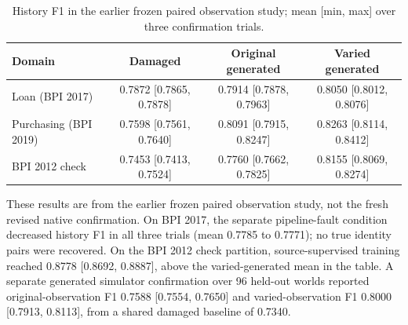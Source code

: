 \begin{table}[t]
\centering
\small
\caption{History F1 in the earlier frozen paired observation study; mean [min, max] over three confirmation trials.}
\label{tab:original-paired-observation-results}
\begin{tabular}{lccc}
\toprule
Domain & Damaged & Original generated & Varied generated \\
\midrule
Loan (BPI 2017) & 0.7872 [0.7865, 0.7878] & 0.7914 [0.7878, 0.7963] & 0.8050 [0.8012, 0.8076] \\
Purchasing (BPI 2019) & 0.7598 [0.7561, 0.7640] & 0.8091 [0.7915, 0.8247] & 0.8263 [0.8114, 0.8412] \\
BPI 2012 check & 0.7453 [0.7413, 0.7524] & 0.7760 [0.7662, 0.7825] & 0.8155 [0.8069, 0.8274] \\
\bottomrule
\end{tabular}
\end{table}

These results are from the earlier frozen paired observation study, not the fresh revised native confirmation. On BPI 2017, the separate pipeline-fault condition decreased history F1 in all three trials (mean 0.7785 to 0.7771); no true identity pairs were recovered. On the BPI 2012 check partition, source-supervised training reached 0.8778 [0.8692, 0.8887], above the varied-generated mean in the table. A separate generated simulator confirmation over 96 held-out worlds reported original-observation F1 0.7588 [0.7554, 0.7650] and varied-observation F1 0.8000 [0.7913, 0.8113], from a shared damaged baseline of 0.7340.
